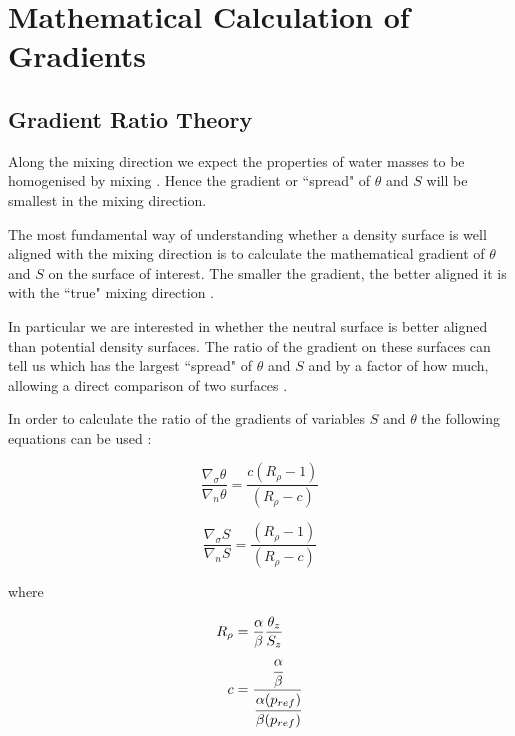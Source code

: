 \label{chapter:testingofneutraltheory}
\section{Mathematical Calculation of Gradients}
\label{section:gradienttheorymathematical}
\subsection{Gradient Ratio Theory}
\label{subsection:gradienttheorymathematicaltheory}

Along the mixing direction we expect the properties of water masses to be homogenised by mixing \citet{McDougall1987}. Hence the gradient or ``spread" of $\theta$ and $S$ will be smallest in the mixing direction.

The most fundamental way of understanding whether a density surface is well aligned with the mixing direction is to calculate the mathematical gradient of $\theta$ and $S$ on the surface of interest. The smaller the gradient, the better aligned it is with the ``true" mixing direction \citep{McDougall1987} \citep{Tailleux2016}. 

In particular we are interested in whether the neutral surface is better aligned than potential density surfaces. The ratio of the gradient on these surfaces can tell us which has the largest ``spread" of $\theta$ and $S$ and by a factor of how much, allowing a direct comparison of two surfaces \citet{McDougall1987}. 

In order to calculate the ratio of the gradients of variables $S$ and $\theta$ the following equations can be used \citep{McDougall1987}:

\begin{equation}
    \frac{\nabla_{\sigma}\theta}{\nabla_{n}\theta} = \frac{c(R_{\rho} - 1)}{(R_{\rho} - c)} 
    \label{equation:gradient_ratio_theta}
\end{equation}

\begin{equation}
    \frac{\nabla_{\sigma}S}{\nabla_{n}S} = \frac{(R_{\rho} - 1)}{(R_{\rho} - c)} 
    \label{equation:gradient_ratio_s}
\end{equation}

where

\begin{align}
    R_{\rho} &= \frac{\alpha}{\beta}\frac{\theta_z}{S_z}\\
    c &= \frac{\cfrac{\alpha}{\beta}}{\cfrac{\alpha(p_{ref})}{\beta(p_{ref})}} 
\end{align}

